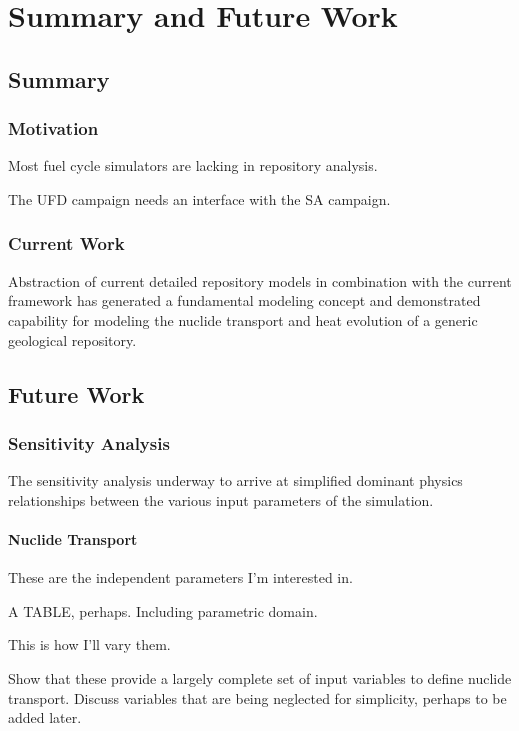 \chapter{Summary and Future Work}\label{ch:future}

\section{Summary}

\subsection{Motivation}

Most fuel cycle simulators are lacking in repository analysis. 

The \gls{UFD} campaign needs an interface with the \gls{SA} campaign.

\subsection{Current Work}

Abstraction of current detailed repository models in combination with the 
current \Cyclus framework has generated a fundamental modeling concept and 
demonstrated capability for modeling the nuclide transport and heat evolution of 
a generic geological repository.

\section{Future Work}

\subsection{Sensitivity Analysis}

The sensitivity analysis underway to arrive at simplified dominant physics 
relationships between the various input parameters of the simulation. 

\subsubsection{Nuclide Transport}

These are the independent parameters I'm interested in.

A TABLE, perhaps. Including parametric domain.

This is how I'll vary them.

Show that these provide a largely complete set of input variables to define 
nuclide transport. Discuss variables that are being neglected for simplicity, 
perhaps to be added later. 

